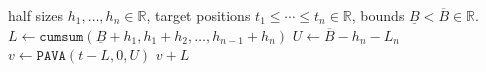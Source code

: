 \documentclass[12pt]{article}
\begin{document}
\begin{algorithm}
\begin{algorithmic}
  \Require half sizes $h_1,\dots,h_n\in\mathbb R$, target positions $t_1\leq\cdots\leq t_n\in\mathbb R$, bounds $\underline B<\overline B\in \mathbb R$.
  \State $L \gets \texttt{cumsum}(\underline B+h_1, h_1+h_2, \dots, h_{n-1}+h_n)$
  \State $U \gets \overline B-h_n-L_n$
  \State $v \gets \texttt{PAVA}(t-L, 0, U)$
  \State \Return $v+L$
\end{algorithmic}
  \caption{\label{alg:pava-pos}PAVA for label position optimization}
\end{algorithm}
\end{document}
